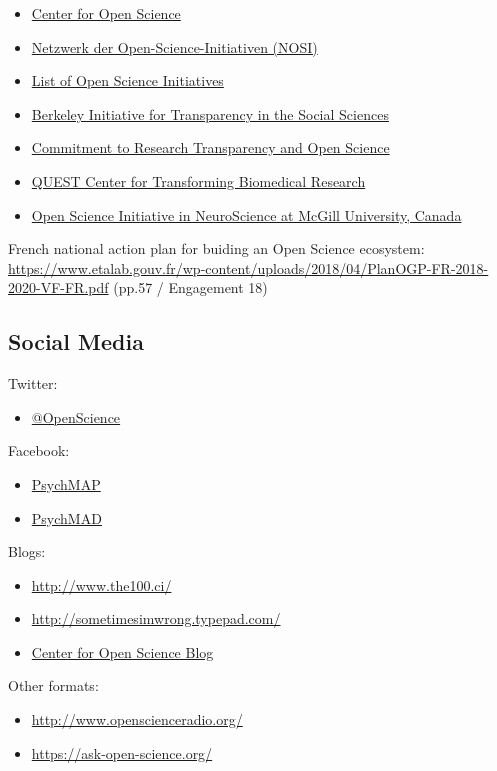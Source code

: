 \documentclass[12pt,]{report}
\providecommand{\tightlist}{%
  \setlength{\itemsep}{0pt}\setlength{\parskip}{0pt}}
\begin{document}
\begin{itemize}
\tightlist
\item
  \href{https://cos.io/}{Center for Open Science}
\item
  \href{https://osf.io/tbkzh/}{Netzwerk der Open-Science-Initiativen
  (NOSI)}
\item
  \href{https://osf.io/tbkzh/wiki/home/}{List of Open Science
  Initiatives}
\item
  \href{https://www.bitss.org/}{Berkeley Initiative for Transparency in
  the Social Sciences}
\item
  \href{http://www.researchtransparency.org/}{Commitment to Research
  Transparency and Open Science}
\item
  \href{https://www.bihealth.org/de/quest-center/}{QUEST Center for
  Transforming Biomedical Research}
\item
  \href{https://www.mcgill.ca/neuro/open-science-0}{Open Science
  Initiative in NeuroScience at McGill University, Canada}
\end{itemize}

French national action plan for buiding an Open Science ecosystem:
\url{https://www.etalab.gouv.fr/wp-content/uploads/2018/04/PlanOGP-FR-2018-2020-VF-FR.pdf}
(pp.57 / Engagement 18)

\subsection{Social Media}\label{social-media}

Twitter:

\begin{itemize}
\tightlist
\item
  \href{https://twitter.com/openscience}{@OpenScience}
\end{itemize}

Facebook:

\begin{itemize}
\tightlist
\item
  \href{https://www.facebook.com/groups/psychmap/about/}{PsychMAP}
\item
  \href{https://www.facebook.com/groups/853552931365745/?ref=group_header}{PsychMAD}
\end{itemize}

Blogs:

\begin{itemize}
\tightlist
\item
  \url{http://www.the100.ci/}
\item
  \url{http://sometimesimwrong.typepad.com/}
\item
  \href{https://cos.io/blog/}{Center for Open Science Blog}
\end{itemize}

Other formats:

\begin{itemize}
\tightlist
\item
  \url{http://www.openscienceradio.org/}
\item
  \url{https://ask-open-science.org/}
\end{itemize}
\end{document}
